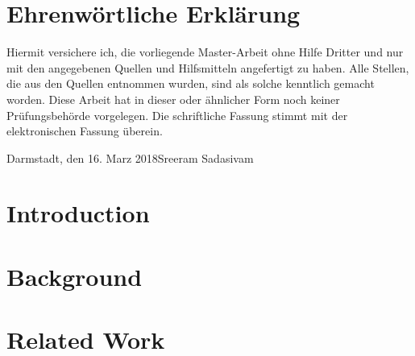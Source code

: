 \documentclass[longdoc,accentcolor=tud1b,12pt,paper=a4]{tudreport}
\title{\deedsTitle}
\subtitle{\deedsThesisType}
\newcommand{\deedsThesisType}{Master-Arbeit\xspace} %
\newcommand{\deedsName}{Sreeram Sadasivam\xspace}
\newcommand{\deedsSubmissionDate}{16. Marz 2018\xspace}%
\begin{document}
	\frenchspacing
	\raggedbottom
	\maketitle
	
	\chapter*{Ehrenw\"ortliche Erkl\"arung}
	Hiermit versichere ich, die vorliegende \deedsThesisType ohne Hilfe Dritter und nur mit den angegebenen Quellen
    und Hilfsmitteln angefertigt zu haben. Alle Stellen, die aus den Quellen entnommen wurden, sind als solche
    kenntlich gemacht worden. Diese Arbeit hat in dieser oder \"ahnlicher Form noch keiner Pr\"ufungsbeh\"orde vorgelegen.
    Die schriftliche Fassung stimmt mit der elektronischen Fassung \"uberein.
    
	
	\vspace{1.5cm}
	
	\noindent Darmstadt, den \deedsSubmissionDate\hfill \deedsName
	
	\tableofcontents
	\listoffigures
	\listoftables

	\begin{abstract}
	
	\end{abstract}		
	
	
	\cleardoublepage

	
	\chapter{Introduction \label{intro}}	
			
	
	\chapter{Background \label{bkgd}}
	
	
	\chapter{Related Work \label{rel_work}}
	
	
\end{document}
